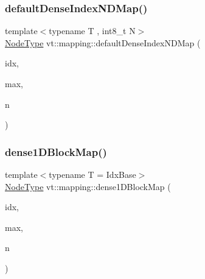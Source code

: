 \subsubsection{\texorpdfstring{default\+Dense\+Index\+N\+D\+Map()}{defaultDenseIndexNDMap()}}
{\footnotesize\ttfamily template$<$typename T , int8\+\_\+t N$>$ \\
\hyperlink{namespacevt_a866da9d0efc19c0a1ce79e9e492f47e2}{Node\+Type} vt\+::mapping\+::default\+Dense\+Index\+N\+D\+Map (\begin{DoxyParamCaption}\item[{\hyperlink{namespacevt_1_1mapping_ab77f5302cd346d499e48a8c796043746}{Idx\+N\+D\+Ptr}$<$ T, N $>$}]{idx,  }\item[{\hyperlink{namespacevt_1_1mapping_ab77f5302cd346d499e48a8c796043746}{Idx\+N\+D\+Ptr}$<$ T, N $>$}]{max,  }\item[{\hyperlink{namespacevt_a866da9d0efc19c0a1ce79e9e492f47e2}{Node\+Type}}]{n }\end{DoxyParamCaption})}

\mbox{\label{namespacevt_1_1mapping_a2d49151f03d4ce393b01c620f6b18517}} 
\subsubsection{\texorpdfstring{dense1\+D\+Block\+Map()}{dense1DBlockMap()}}
{\footnotesize\ttfamily template$<$typename T  = Idx\+Base$>$ \\
\hyperlink{namespacevt_a866da9d0efc19c0a1ce79e9e492f47e2}{Node\+Type} vt\+::mapping\+::dense1\+D\+Block\+Map (\begin{DoxyParamCaption}\item[{\hyperlink{namespacevt_1_1mapping_a8b576cf2f31069778e4951f64bccafd8}{Idx1\+D\+Ptr}$<$ T $>$}]{idx,  }\item[{\hyperlink{namespacevt_1_1mapping_a8b576cf2f31069778e4951f64bccafd8}{Idx1\+D\+Ptr}$<$ T $>$}]{max,  }\item[{\hyperlink{namespacevt_a866da9d0efc19c0a1ce79e9e492f47e2}{Node\+Type}}]{n }\end{DoxyParamCaption})}

\mbox{\label{namespacevt_1_1mapping_a23ab17dfed32328ca92d270f1d13d090}} 
